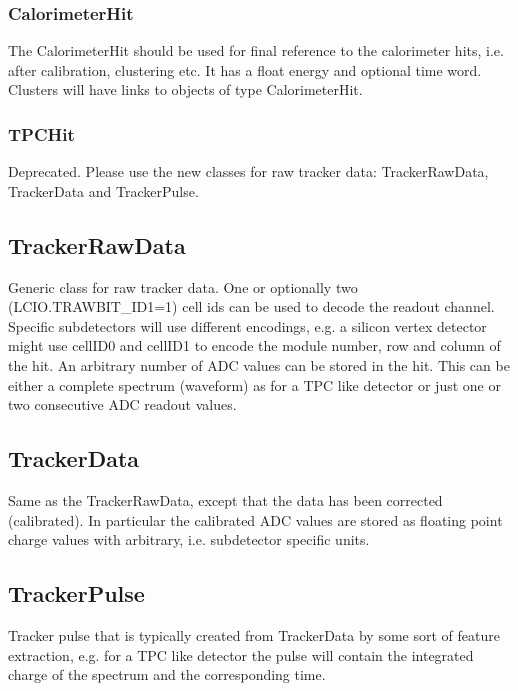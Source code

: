 \documentclass[twoside]{article}
\begin{document}
\subsubsection{CalorimeterHit}
The CalorimeterHit should be used for final reference to the calorimeter hits, i.e. after calibration, 
clustering etc. It has a float energy and optional time word. Clusters will have links to objects of type 
CalorimeterHit.

\subsubsection{TPCHit}
Deprecated. Please use the new classes for raw tracker data: TrackerRawData, TrackerData and TrackerPulse.

\subsection{TrackerRawData}
Generic class for raw tracker data. One or optionally two (LCIO.TRAWBIT\_ID1=1) cell ids can be used to decode the
readout channel. Specific subdetectors will use different encodings, e.g. a silicon vertex detector might use 
cellID0 and cellID1 to encode the module number, row and column of the hit. An arbitrary number of ADC values can be 
stored in the hit. This can be either a complete spectrum (waveform) as for a TPC like detector or just one or two 
consecutive ADC readout values.

\subsection{TrackerData}
Same as the TrackerRawData, except that the data has been corrected (calibrated). In particular the calibrated ADC 
values are stored as floating point charge values with arbitrary, i.e. subdetector specific units. 

\subsection{TrackerPulse}
Tracker pulse that is typically created from TrackerData by some sort of feature extraction, e.g. for a TPC like detector
the pulse will contain the integrated charge of the spectrum and the corresponding time.
\end{document}
